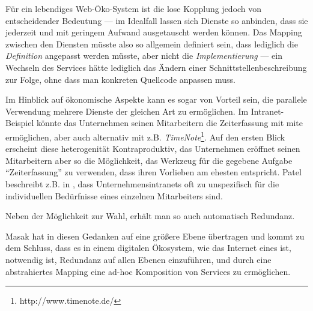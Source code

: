 Für ein lebendiges Web-Öko-System ist die lose Kopplung jedoch von entscheidender Bedeutung --- im Idealfall lassen sich Dienste so anbinden, dass sie jederzeit und mit geringem Aufwand ausgetauscht werden können. Das Mapping zwischen den Diensten müsste also so allgemein definiert sein, dass lediglich die \emph{Definition} angepasst werden müsste, aber nicht die \emph{Implementierung} --- ein Wechseln des Services hätte lediglich das Ändern einer Schnittstellenbeschreibung zur Folge, ohne dass man konkreten Quellcode anpassen muss.

Im Hinblick auf ökonomische Aspekte kann es sogar von Vorteil sein, die parallele Verwendung mehrere Dienste der gleichen Art zu ermöglichen. Im Intranet-Beispiel könnte das Unternehmen seinen Mitarbeitern die Zeiterfassung mit \ac{mite} ermöglichen, aber auch alternativ mit z.B. \emph{TimeNote}\footnote{http://www.timenote.de/}. Auf den ersten Blick erscheint diese heterogenität Kontraproduktiv, das Unternehmen eröffnet seinen Mitarbeitern aber so die Möglichkeit, das Werkzeug für die gegebene Aufgabe "`Zeiterfassung"' zu verwenden, dass ihren  Vorlieben am ehesten entspricht. Patel beschreibt z.B. in \cite{pl-depintra}, dass Unternehmensintranets oft zu unspezifisch für die individuellen Bedürfnisse eines einzelnen Mitarbeiters sind.

Neben der Möglichkeit zur Wahl, erhält man so auch automatisch Redundanz.

Masak hat in \cite{mkulss} diesen Gedanken auf eine größere Ebene übertragen und kommt zu dem Schluss, dass es in einem digitalen Ökosystem, wie das Internet eines ist, notwendig ist, Redundanz auf allen Ebenen einzuführen, und durch eine abstrahiertes Mapping eine ad-hoc Komposition von Services zu ermöglichen.
